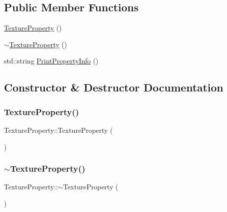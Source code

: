 \subsection*{Public Member Functions}
\begin{DoxyCompactItemize}
\item 
\mbox{\hyperlink{class_texture_property_adc8b4c8e7f5730ad66d2e4f0e3132e76}{Texture\+Property}} ()
\item 
\mbox{\hyperlink{class_texture_property_a8ca1eddf2a320c3ae2d03c2725c3d337}{$\sim$\+Texture\+Property}} ()
\item 
std\+::string \mbox{\hyperlink{class_texture_property_a701b7bb567726578a322b078d35b8711}{Print\+Property\+Info}} ()
\end{DoxyCompactItemize}


\subsection{Constructor \& Destructor Documentation}
\mbox{\label{class_texture_property_adc8b4c8e7f5730ad66d2e4f0e3132e76}} 
\subsubsection{\texorpdfstring{TextureProperty()}{TextureProperty()}}
{\footnotesize\ttfamily Texture\+Property\+::\+Texture\+Property (\begin{DoxyParamCaption}{ }\end{DoxyParamCaption})}

\mbox{\label{class_texture_property_a8ca1eddf2a320c3ae2d03c2725c3d337}} 
\subsubsection{\texorpdfstring{$\sim$TextureProperty()}{~TextureProperty()}}
{\footnotesize\ttfamily Texture\+Property\+::$\sim$\+Texture\+Property (\begin{DoxyParamCaption}{ }\end{DoxyParamCaption})}



